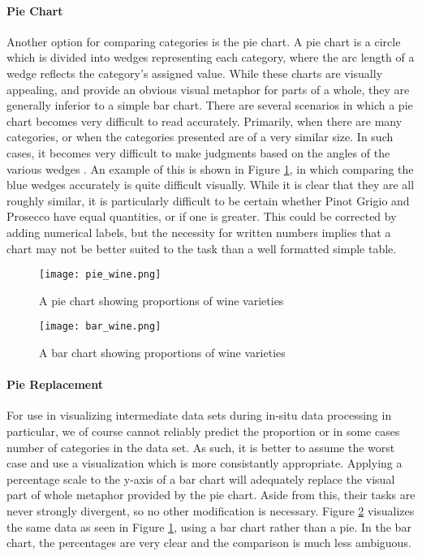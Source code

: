 \paragraph{Pie Chart}
Another option for comparing categories is the pie chart. A pie chart is a circle which is divided into wedges representing each category, where the arc length of a wedge reflects the category's assigned value. While these charts are visually appealing, and provide an obvious visual metaphor for parts of a whole, they are generally inferior to a simple bar chart. There are several scenarios in which a pie chart becomes very difficult to read accurately. Primarily, when there are many categories, or when the categories presented are of a very similar size. In such cases, it becomes very difficult to make judgments based on the angles of the various wedges \citep{Robbins2005}. An example of this is shown in Figure \ref{fig:winepie}, in which comparing the blue wedges accurately is quite difficult visually. While it is clear that they are all roughly similar, it is particularly difficult to be certain whether Pinot Grigio and Prosecco have equal quantities, or if one is greater. This could be corrected by adding numerical labels, but the necessity for written numbers implies that a chart may not be better suited to the task than a well formatted simple table. 

\begin{figure}
	\centering
	\texttt{[image: pie\_wine.png]}
	\caption{A pie chart showing proportions of wine varieties \citep{Few2007}}
	\label{fig:winepie}
\end{figure}

\begin{figure}
	\centering
	\texttt{[image: bar\_wine.png]}
	\caption{A bar chart showing proportions of wine varieties \citep{Few2007}}
	\label{fig:winebar}
\end{figure}

\paragraph{Pie Replacement}
For use in visualizing intermediate data sets during in-situ data processing in particular, we of course cannot reliably predict the proportion or in some cases number of categories in the data set. As such, it is better to assume the worst case and use a visualization which is more consistantly appropriate. Applying a percentage scale to the y-axis of a bar chart will adequately replace the visual part of whole metaphor provided by the pie chart. Aside from this, their tasks are never strongly divergent, so no other modification is necessary. Figure \ref{fig:winebar} visualizes the same data as seen in Figure \ref{fig:winepie}, using a bar chart rather than a pie. In the bar chart, the percentages are very clear and the comparison is much less ambiguous.

